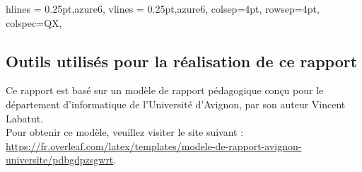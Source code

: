 \begin{appendices}
\begin{longtblr}[caption={Extrait des règles et pratiques de développement logiciel instaurées par Cegedim SRH}, label={tab:dev}]{
    hlines = {0.25pt,azure6},
    vlines = {0.25pt,azure6},
    colsep=4pt,
    rowsep=4pt,
	colspec={QX},
}


\end{longtblr}
\subsection{Outils utilisés pour la réalisation de ce rapport}
Ce rapport est basé sur un modèle de rapport pédagogique conçu pour le département d'informatique de l'Université d'Avignon, par son auteur Vincent Labatut.\\
Pour obtenir ce modèle, veuillez visiter le site suivant : \url{https://fr.overleaf.com/latex/templates/modele-de-rapport-avignon-universite/pdbgdpzsgwrt}.\\


\end{appendices}
